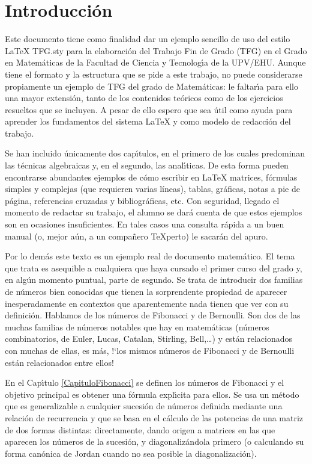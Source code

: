 \chapter{Introducci\'on}

Este documento tiene como  finalidad dar un ejemplo sencillo de uso del estilo LaTeX TFG.sty para la elaboraci\'on del Trabajo Fin de Grado (TFG) en el Grado en Matem\'aticas de la Facultad de Ciencia y Tecnolog\'\i a de la UPV/EHU. Aunque tiene el formato y la estructura que se pide a este trabajo, no puede considerarse propiamente un ejemplo de TFG del grado de Matem\'aticas: le faltar\'\i a para ello una mayor extensi\'on, tanto de los contenidos te\'oricos como de los ejercicios resueltos que se incluyen. A pesar de ello espero que sea \'util  como ayuda para aprender los fundamentos del sistema LaTeX y como modelo de redacci\'on del trabajo.

Se han incluido \'unicamente dos cap\'\i tulos, en el primero de los cuales predominan las t\'ecnicas algebraicas y, en el segundo, las anal\'\i ticas. De esta forma pueden encontrarse abundantes ejemplos de c\'omo escribir en LaTeX matrices, f\'ormulas simples y complejas (que requieren varias l\'ineas), tablas,  gr\'aficas, notas a pie de p\'agina, referencias cruzadas y bibliogr\'aficas, etc. Con seguridad, llegado el momento de redactar su trabajo, el alumno se dar\'a cuenta de que estos ejemplos son  en ocasiones insuficientes.  En tales casos una consulta r\'apida a un buen manual (o, mejor a\'un, a un compa\~nero TeXperto) le sacar\'an del apuro.

Por lo dem\'as este texto es un ejemplo real de documento matem\'atico. El tema que trata es asequible a cualquiera que haya cursado el primer curso del grado y, en alg\'un momento puntual, parte de segundo. Se trata de introducir dos familias de n\'umeros bien conocidas que tienen la sorprendente propiedad de aparecer inesperadamente en contextos que aparentemente   nada tienen que ver con su definici\'on. Hablamos de los n\'umeros de Fibonacci y de Bernoulli. Son dos de las muchas familias de n\'umeros notables que hay en matem\'aticas (n\'umeros combinatorios, de Euler, Lucas, Catalan, Stirling, Bell,\ldots) y est\'an relacionados con muchas de ellas, es m\'as, !`los mismos n\'umeros de Fibonacci y de Bernoulli est\'an relacionados entre ellos!

En el Cap\'\i tulo \ref{CapituloFibonacci} se definen los n\'umeros de Fibonacci y el objetivo principal es obtener una f\'ormula expl\'\i cita para ellos. Se usa un m\'etodo que es generalizable a cualquier sucesi\'on de n\'umeros definida mediante una relaci\'on de recurrencia y que se basa en el c\'alculo de las potencias de una matriz de dos formas distintas: directamente, dando origen a matrices en las que aparecen los n\'umeros de la sucesi\'on, y diagonaliz\'andola primero (o calculando su forma can\'onica de Jordan cuando no sea posible la diagonalizaci\'on).

